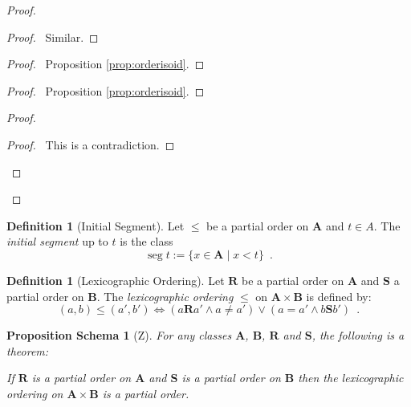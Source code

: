 \documentclass{book}
\let\qed\relax
\newtheorem{props}[ax]{Proposition Schema}
\theoremstyle{definition}
\newtheorem{df}[ax]{Definition}
\newcommand{\seg}{\ensuremath{\operatorname{seg}}}
\begin{document}
\begin{proof}
\begin{proof}
	\pf\ Similar.
\end{proof}
\begin{proof}
	\pf\ Proposition \ref{prop:orderisoid}.
\end{proof}
\begin{proof}
	\pf\ Proposition \ref{prop:orderisoid}.
\end{proof}
\begin{proof}
	\qedstep
	\begin{proof}
		\pf\ This is a contradiction.
	\end{proof}
\end{proof}
\qed
\end{proof}

\begin{df}[Initial Segment]
Let $\leq$ be a partial order on $\mathbf{A}$ and $t \in A$. The \emph{initial segment} up to $t$ is the class
\[ \seg t := \{ x \in \mathbf{A} \mid x < t \} \enspace . \]
\end{df}

\begin{df}[Lexicographic Ordering]
Let $\mathbf{R}$ be a partial order on $\mathbf{A}$ and $\mathbf{S}$ a partial order on $\mathbf{B}$. The \emph{lexicographic ordering} $\leq$ on $\mathbf{A} \times \mathbf{B}$ is defined by:
\[ (a,b) \leq (a',b') \Leftrightarrow (a \mathbf{R} a' \wedge a \neq a') \vee (a = a' \wedge b \mathbf{S} b') \enspace . \]
\end{df}

\begin{props}[Z]
\label{prop:lexicposet}
For any classes $\mathbf{A}$, $\mathbf{B}$, $\mathbf{R}$ and $\mathbf{S}$, the following is a theorem:

If $\mathbf{R}$ is a partial order on $\mathbf{A}$ and $\mathbf{S}$ is a partial order on $\mathbf{B}$ then the lexicographic ordering on $\mathbf{A} \times \mathbf{B}$ is a partial order.
\end{props}
\end{document}
